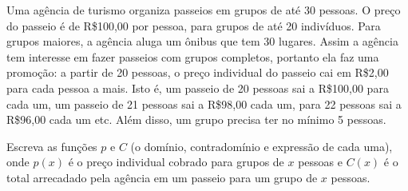 Uma agência de turismo organiza passeios em grupos de até 30 pessoas.
O preço do passeio é de R\$100,00 por pessoa, para grupos de até 20 indivíduos.
Para grupos maiores, a agência aluga um ônibus que tem 30 lugares.
Assim a agência tem interesse em fazer passeios com grupos completos, portanto
ela faz uma promoção: a partir de 20 pessoas, o preço individual do passeio cai em R\$2,00 para cada
pessoa a mais. 
Isto é, um passeio de 20 pessoas sai a R\$100,00 para cada um, um passeio de 21 pessoas sai a R\$98,00 cada um,
para 22 pessoas sai a R\$96,00 cada um etc.
Além disso, um grupo precisa ter no mínimo 5 pessoas.

Escreva as funções $p$ e $C$ (o domínio, contradomínio e expressão de cada uma), onde $p(x)$ é o preço
individual cobrado para grupos de $x$ pessoas e $C(x)$ é o total arrecadado pela agência em um passeio
para um grupo de $x$ pessoas.

